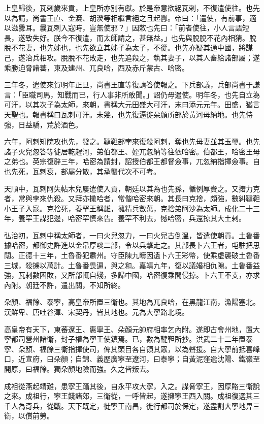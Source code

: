 \begin{pinyinscope}
上皇歸後，瓦剌歲來貢，上皇所亦別有獻。於是帝意欲絕瓦剌，不復遣使往。也先以為請，尚書王直、金濂、胡濙等相繼言絕之且起釁。帝曰：「遣使，有前事，適以滋釁耳。曩瓦剌入寇時，豈無使邪？」因敕也先曰：「前者使往，小人言語短長，遂致失好。朕今不復遣，而太師請之，甚無益。」也先與脫脫不花內相猜。脫脫不花妻，也先姊也，也先欲立其姊子為太子，不從。也先亦疑其通中國，將謀己，遂治兵相攻。脫脫不花敗走，也先追殺之，執其妻子，以其人畜給諸部屬；遂乘勝迫脅諸蕃，東及建州、兀良哈，西及赤斤蒙古、哈密。

三年冬，遣使來賀明年正旦，尚書王直等復請答使報之。下兵部議，兵部尚書于謙言：「臣職司馬，知戰而已，行人事非所敢聞。」詔仍毋遣使。明年冬，也先自立為可汗，以其次子為太師，來朝，書稱大元田盛大可汗，末曰添元元年。田盛，猶言天聖也。報書稱曰瓦剌可汗。未幾，也先復逼徙朵顏所部於黃河母納地。也先恃強，日益驕，荒於酒色。

六年，阿剌知院攻也先，發之。韃靼部孛來復殺阿剌，奪也先母妻並其玉璽。也先諸子火兒忽答等徙居乾趕河，弟伯都王、姪兀忽納等往依哈密。伯都王，哈密王母之弟也。英宗復辟三年，哈密為請封，詔授伯都王都督僉事，兀忽納指揮僉事。自也先死，瓦剌衰，部屬分散，其承襲代次不可考。

天順中，瓦剌阿失帖木兒屢遣使入貢，朝廷以其為也先孫，循例厚賚之。又撦力克者，常與孛來仇殺。又拜亦撒哈者，常偕哈密來朝。其長曰克捨，頗強，數糾韃靼小王子入寇。克捨死，養罕王稱雄，擁精兵數萬，克捨弟阿沙為太師。成化二十三年，養罕王謀犯邊，哈密罕慎來告。養罕不利去，憾哈密，兵還掠其大土剌。

弘治初，瓦剌中稱太師者，一曰火兒忽力，一曰火兒古倒溫，皆遣使朝貢。土魯番據哈密，都御史許進以金帛厚啖二部，令以兵擊走之。其部長卜六王者，屯駐把思闊。正德十三年，土魯番犯肅州。守臣陳九疇因遺卜六王彩幣，使乘虛襲破土魯番三城，殺擄以萬計。土魯番畏逼，與之和。嘉靖九年，復以議婚相仇隙。土魯番益強，瓦剌數困敗，又所部輒自殘，多歸中國，哈密復乘間侵掠。卜六王不支，亦求內附。朝廷不許，遣出關，不知所終。

朵顏、福餘、泰寧，高皇帝所置三衛也。其地為兀良哈，在黑龍江南，漁陽塞北。漢鮮卑、唐吐谷渾、宋契丹，皆其地也。元為大寧路北境。

高皇帝有天下，東蕃遼王、惠寧王、朵顏元帥府相率乞內附。遂即古會州地，置大寧都司營州諸衛，封子權為寧王使鎮焉。已，數為韃靼所抄。洪武二十二年置泰寧、朵顏、福餘三衛指揮使司，俾其頭目各自領其眾，以為聲援。自大寧前抵喜峰口，近宣府，曰朵顏；自錦、義歷廣寧至遼河，曰泰寧；自黃泥窪逾沈陽、鐵嶺至開原，曰福餘。獨朵顏地險而強。久之皆叛去。

成祖從燕起靖難，患寧王躡其後，自永平攻大寧，入之。謀脅寧王，因厚賂三衛說之來。成祖行，寧王餞諸郊，三衛從，一呼皆起，遂擁寧王西入關。成祖復選其三千人為奇兵，從戰。天下既定，徙寧王南昌，徙行都司於保定，遂盡割大寧地畀三衛，以償前勞。


\end{pinyinscope}
